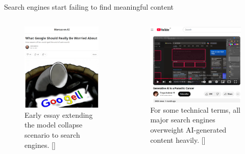 \documentclass[10pt]{beamer}
\newcommand{\citeme}[1]{{\xspace\color{scAqua} \scriptsize [\cite{#1}]}}
\begin{document}
\begin{frame}{Search engines start failing to find meaningful content}
	\begin{columns}[T,onlytextwidth]
		\hspace*{-0.7cm} 
		\begin{figure}
			\includegraphics[width=\textwidth]{figures/marcusg-google.png}
			\caption{Early essay extending the model collapse scenario to search engines.\citeme{Marcus2023}}
		\end{figure}
		
		\begin{figure}
			\includegraphics[width=1.17\textwidth]{figures/holmer-parasiticcancer.png}
			\caption{For some technical terms, all major search engines overweight AI-generated content heavily.\citeme{Holmer2025}}
		\end{figure}
		

\end{columns}
\end{frame}
\end{document}
